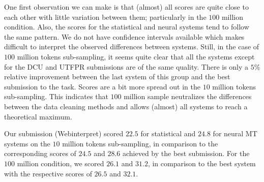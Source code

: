 One first observation we can make is that (almost) all scores are quite close to each other with little variation between them; particularly in the $100$ million condition. Also, the scores for the statistical and neural systems tend to follow the same pattern. We do not have confidence intervals available which makes difficult to interpret the observed differences between systems. Still, in the case of $100$ million tokens sub-sampling, it seems quite clear that all the systems except for the DCU and UTFPR submissions are of the same quality. There is only a $5\%$ relative improvement between the last system of this group and the best submission to the task. Scores are a bit more spread out in the $10$ million tokens sub-sampling. This indicates that $100$ million sample neutralizes the differences between the data cleaning methods and allows (almost) all systems to reach a theoretical maximum.

Our submission (Webinterpret) scored $22.5$ for statistical and $24.8$ for neural MT systems on the $10$ million tokens sub-sampling, in comparison to the corresponding scores of $24.5$ and $28.6$ achieved by the best submission. For the $100$ million condition, we scored $26.1$ and $31.2$, in comparison to the best system with the respective scores of $26.5$ and $32.1$. 
